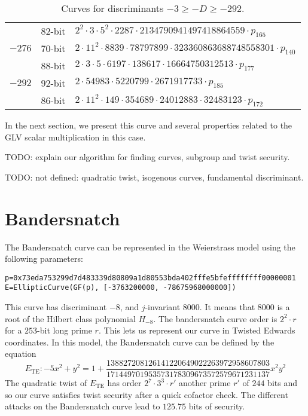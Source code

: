 \documentclass{amsart}
\newcommand{\SM}[1]{\color{blue}#1\color{black}}
\begin{document}
\begin{table*}[!ht]
\begin{tabularx}{\textwidth}{ccl}
 & $82$-bit & $2^{2}  \cdot 3  \cdot 5^{2}  \cdot 2287  \cdot 2134790941497418864559  \cdot p_{165}$\\
$-276$ & $70$-bit & $2  \cdot 11^{2}  \cdot 8839  \cdot 78797899  \cdot 323360863688748558301  \cdot p_{140}$\\
 & $88$-bit & $2  \cdot 3  \cdot 5  \cdot 6197  \cdot 138617  \cdot 16664750312513  \cdot p_{177}$\\
$-292$ & $92$-bit & $2  \cdot 54983  \cdot 5220799  \cdot 2671917733  \cdot p_{185}$\\
 & $86$-bit & $2  \cdot 11^{2}  \cdot 149  \cdot 354689  \cdot
24012883  \cdot 32483123  \cdot p_{172}$\\
\bottomrule
    \end{tabularx}
    \caption{Curves for discriminants $-3 \geq -D \geq -292$.}
    \label{tab:group-order-factorization}
\end{table*}

In the next section, we present this curve and several properties
related to the  GLV scalar multiplication in this case.

\SM{TODO: explain our algorithm for finding curves, subgroup and twist
  security.}

\SM{TODO: not defined: quadratic twist, isogenous curves, fundamental
  discriminant.}

\section{Bandersnatch} 

The Bandersnatch curve can be represented in the Weierstrass model
using the following parameters:
\begin{verbatim}
p=0x73eda753299d7d483339d80809a1d80553bda402fffe5bfeffffffff00000001
E=EllipticCurve(GF(p), [-3763200000, -78675968000000])
\end{verbatim}
This curve has discriminant $-8$, and $j$-invariant $8000$. It means
that $8000$ is a root of the Hilbert class polynomial $H_{-8}$.
The bandersnatch curve order is $2^2\cdot r$ for a $253$-bit long
prime $r$.
This lets us represent our curve in Twisted Edwards coordinates.
In this model, the Bandersnatch curve can be defined by the equation
$$E_\text{TE}:-5x^2+y^2 = 1 + \frac{138827208126141220649022263972958607803}{171449701953573178309673572579671231137}x^2y^2$$ 
The quadratic twist of $E_\text{TE}$ has order $2^7 \cdot 3^3 \cdot r'$ another
prime $r'$ of $244$ bits
and so our curve satisfies twist security after a quick cofactor
check.
The different attacks on the Bandersnatch curve lead to $125.75$ bits
of security.
\end{document}
